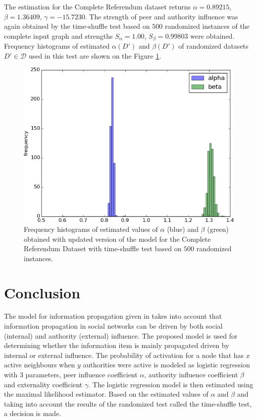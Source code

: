 \documentclass[times, utf8, zavrsni]{fer}
\begin{document}
The estimation for the Complete Referendum dataset returns $\alpha=0.89215$, $\beta=1.36409$, $\gamma=-15.7230$. The strength of peer and authority influence was again obtained by the time-shuffle test based on $500$ randomized instances of the complete input graph and strengths $S_{\alpha} = 1.00$, $S_{\beta} = 0.99803$ were obtained. Frequency histograms of estimated $\alpha(D')$ and $\beta(D')$ of randomized datasets $D' \in \mathcal{D}$ used in this test are shown on the Figure \ref{hist_full3}. 
\begin{figure}[htp]
\centering
\includegraphics[scale=0.7]{abg500v.png}	
\caption{Frequency histograms of estimated values of $\alpha$ (blue) and $\beta$ (green)  obtained with updated version of the model for the Complete Referendum Dataset with time-shuffle test based on $500$ randomized instances.}
\label{hist_full3}
\end{figure}

\chapter{Conclusion}

The model for information propagation given in \cite{authority} takes into account that information propagation in social networks can be driven by both social (internal) and authority (external) influence. The proposed model is used for determining whether the information item is mainly propagated driven by internal or external influence. The probability of activation for a node that has $x$ active neighbours when $y$ authorities were active is modeled as logistic regression with $3$ parameters, peer influence coefficient $\alpha$, authority influence coefficient $\beta$ and externality coefficient $\gamma$. The logistic regression model is then estimated using the maximal likelihood estimator. Based on the estimated values of $\alpha$ and $\beta$ and  taking into account the results of the randomized test called the time-shuffle test, a decision is made. 
\end{document}
